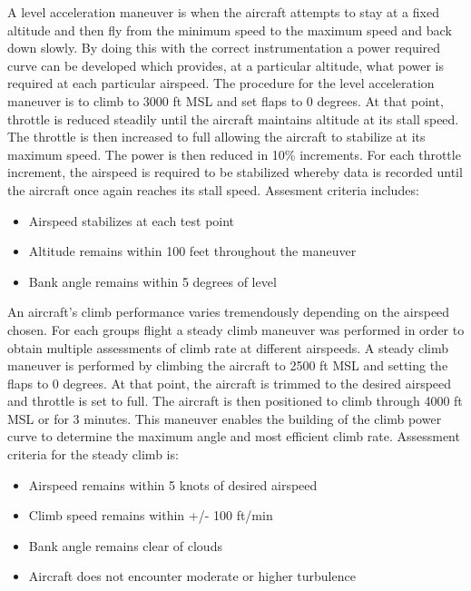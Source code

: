 \documentclass[conf]{new-aiaa}
\begin{document}
\medskip

A level acceleration maneuver is when the aircraft attempts to stay at a fixed altitude and then fly from the minimum speed to the maximum speed and back down slowly. By doing this with the correct instrumentation a power required curve can be developed which provides, at a particular altitude, what power is required at each particular airspeed. The procedure for the level acceleration maneuver is to climb to 3000 ft MSL and set flaps to 0 degrees. At that point, throttle is reduced steadily until the aircraft maintains altitude at its stall speed. The throttle is then increased to full allowing the aircraft to stabilize at its maximum speed. The power is then reduced in 10\% increments. For each throttle increment, the airspeed is required to be stabilized whereby data is recorded until the aircraft once again reaches its stall speed. Assesment criteria includes: 

\medskip

\begin{itemize}
\item Airspeed stabilizes at each test point
\item Altitude remains within 100 feet throughout the maneuver
\item Bank angle remains within 5 degrees of level
\end{itemize}

\medskip

An aircraft's climb performance varies tremendously depending on the airspeed chosen. For each groups flight a steady climb maneuver was performed in order to obtain multiple assessments of climb rate at different airspeeds. A steady climb maneuver is performed by climbing the aircraft to 2500 ft MSL and setting the flaps to 0 degrees. At that point, the aircraft is trimmed to the desired airspeed and throttle is set to full. The aircraft is then positioned to climb through 4000 ft MSL or for 3 minutes. This maneuver enables the building of the climb power curve to determine the maximum angle and most efficient climb rate. Assessment criteria for the steady climb is:

\medskip
\begin{itemize}
\item Airspeed remains within 5 knots of desired airspeed
\item Climb speed remains within +/- 100 ft/min
\item Bank angle remains clear of clouds
\item Aircraft does not encounter moderate or higher turbulence
\end{itemize}
\end{document}
